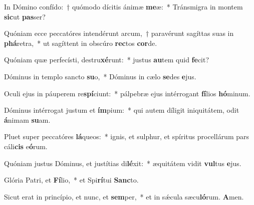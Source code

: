 \item In Dómino confído:~† quómodo dícitis ánimæ \textbf{me}æ:~* Tránsmigra in montem \textbf{sic}ut \textbf{pas}ser?
\item Quóniam ecce peccatóres intendérunt arcum,~† paravérunt sagíttas suas in \textbf{phá}retra,~* ut sagíttent in obscúro \textbf{rec}tos \textbf{cor}de.
\item Quóniam quæ perfecísti, destru\textbf{xé}runt:~* justus \textbf{au}tem quid \textbf{fe}cit?
\item Dóminus in templo sancto \textbf{su}o,~* Dóminus in cælo \textbf{se}des \textbf{e}jus.
\item Oculi ejus in páuperem re\textbf{spí}ciunt:~* pálpebræ ejus intérrogant \textbf{fí}lios \textbf{hó}minum.
\item Dóminus intérrogat justum et \textbf{ím}pium:~* qui autem díligit iniquitátem, odit \textbf{á}nimam \textbf{su}am.
\item Pluet super peccatóres \textbf{lá}queos:~* ignis, et sulphur, et spíritus procellárum pars cáli\textbf{cis} e\textbf{ó}rum.
\item Quóniam justus Dóminus, et justítias di\textbf{lé}xit:~* æquitátem vidit \textbf{vul}tus \textbf{e}jus.
\item Glória Patri, et \textbf{Fí}lio,~* et Spi\textbf{rí}tui \textbf{Sanc}to.
\item Sicut erat in princípio, et nunc, et \textbf{sem}per,~* et in sǽcula sæcu\textbf{ló}rum. \textbf{A}men.
